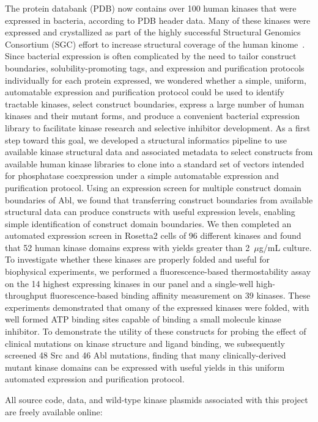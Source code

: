 \documentclass[phd,tocprelim]{cornell}
\begin{document}
The protein databank (PDB) now contains over 100 human kinases that were expressed in bacteria, according to PDB header data.
Many of these kinases were expressed and crystallized as part of the highly successful Structural Genomics Consortium (SGC) effort to increase structural coverage of the human kinome~\citep{sgc-kinome}.
Since bacterial expression is often complicated by the need to tailor construct boundaries, solubility-promoting tags, and expression and purification protocols individually for each protein expressed, we wondered whether a simple, uniform, automatable expression and purification protocol could be used to identify tractable kinases, select construct boundaries, express a large number of human kinases and their mutant forms, and produce a convenient bacterial expression library to facilitate kinase research and selective inhibitor development. 
As a first step toward this goal, we developed a structural informatics pipeline to use available kinase structural data and associated metadata to select constructs from available human kinase libraries to clone into a standard set of vectors intended for phosphatase coexpression under a simple automatable expression and purification protocol. 
Using an expression screen for multiple construct domain boundaries of Abl, we found that transferring construct boundaries from available structural data can produce constructs with useful expression levels, enabling simple identification of construct domain boundaries.  
We then completed an automated expression screen in Rosetta2 cells of 96 different kinases and found that 52 human kinase domains express with yields greater than 2~$\mu$g/mL culture. To investigate whether these kinases are properly folded and useful for biophysical experiments, we performed a fluorescence-based thermostability assay on the 14 highest expressing kinases in our panel and a single-well high-throughput fluorescence-based binding affinity measurement on 39 kinases. These experiments demonstrated that omany of the expressed kinases were folded, with well formed ATP binding sites capable of binding a small molecule kinase inhibitor. 
To demonstrate the utility of these constructs for probing the effect of clinical mutations on kinase structure and ligand binding, we subsequently screened 48 Src and 46 Abl mutations, finding that many clinically-derived mutant kinase domains can be expressed with useful yields in this uniform automated expression and purification protocol.

All source code, data, and wild-type kinase plasmids associated with this project are freely available online:
\end{document}
